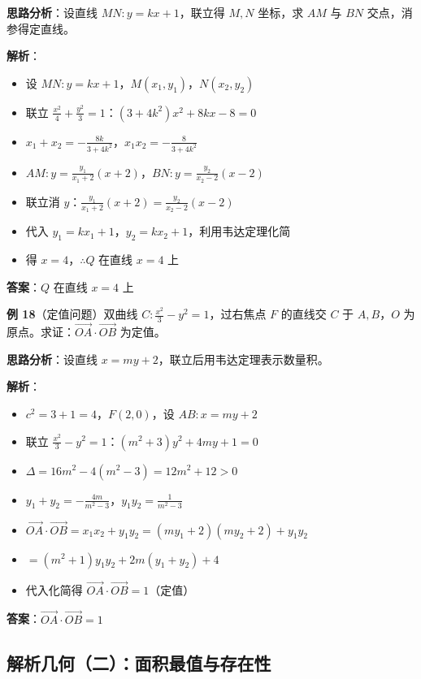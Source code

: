 \textbf{思路分析}：设直线 $MN:y=kx+1$，联立得 $M,N$ 坐标，求 $AM$ 与 $BN$ 交点，消参得定直线。

\textbf{解析}：
\begin{itemize}
  \item 设 $MN:y=kx+1$，$M(x_1,y_1)$，$N(x_2,y_2)$
  \item 联立 $\frac{x^2}{4}+\frac{y^2}{3}=1$：$(3+4k^2)x^2+8kx-8=0$
  \item $x_1+x_2=-\frac{8k}{3+4k^2}$，$x_1x_2=-\frac{8}{3+4k^2}$
  \item $AM:y=\frac{y_1}{x_1+2}(x+2)$，$BN:y=\frac{y_2}{x_2-2}(x-2)$
  \item 联立消 $y$：$\frac{y_1}{x_1+2}(x+2)=\frac{y_2}{x_2-2}(x-2)$
  \item 代入 $y_1=kx_1+1$，$y_2=kx_2+1$，利用韦达定理化简
  \item 得 $x=4$，$\therefore Q$ 在直线 $x=4$ 上
\end{itemize}

\textbf{答案}：$Q$ 在直线 $x=4$ 上

\textbf{例 18}（定值问题）双曲线 $C:\frac{x^2}{3}-y^2=1$，过右焦点 $F$ 的直线交 $C$ 于 $A,B$，$O$ 为原点。求证：$\overrightarrow{OA}\cdot\overrightarrow{OB}$ 为定值。

\textbf{思路分析}：设直线 $x=my+2$，联立后用韦达定理表示数量积。

\textbf{解析}：
\begin{itemize}
  \item $c^2=3+1=4$，$F(2,0)$，设 $AB:x=my+2$
  \item 联立 $\frac{x^2}{3}-y^2=1$：$(m^2+3)y^2+4my+1=0$
  \item $\Delta=16m^2-4(m^2-3)=12m^2+12>0$
  \item $y_1+y_2=-\frac{4m}{m^2-3}$，$y_1y_2=\frac{1}{m^2-3}$
  \item $\overrightarrow{OA}\cdot\overrightarrow{OB}=x_1x_2+y_1y_2=(my_1+2)(my_2+2)+y_1y_2$
  \item $=(m^2+1)y_1y_2+2m(y_1+y_2)+4$
  \item 代入化简得 $\overrightarrow{OA}\cdot\overrightarrow{OB}=1$（定值）
\end{itemize}

\textbf{答案}：$\overrightarrow{OA}\cdot\overrightarrow{OB}=1$

\subsection{解析几何（二）：面积最值与存在性}

